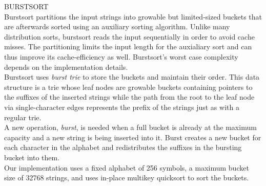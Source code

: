 {\sffamily\normalsize{\color{sciorange} BURSTSORT}}\vspace{1mm}\\
\footnotesize Burstsort partitions the input strings into growable but
limited-sized buckets that are afterwards sorted using an auxiliary
sorting algorithm. Unlike many distribution sorts, burstsort reads the
input sequentially in order to avoid cache misses.  The partitioning
limits the input length for the auxialiary sort and can thus improve
its cache-efficiency as well. Burstsort's worst case complexity
depends on the implementation details.\\

Burstsort uses \emph{burst trie} to store the buckets and maintain
their order. This data structure is a trie whose leaf nodes are
growable buckets containing pointers to the suffixes of the inserted
strings while the path from the root to the leaf node via
single-character edges represents the prefix of the strings just as
with a regular trie.\\

A new operation, \emph{burst}, is needed when a full bucket is already
at the maximum capacity and a new string is being inserted into
it. Burst creates a new bucket for each character in the alphabet and
redistributes the suffixes in the bursting bucket into them.\\

Our implementation uses a fixed alphabet of 256 symbols, a maximum
bucket size of 32768 strings, and uses in-place multikey quicksort to
sort the buckets.